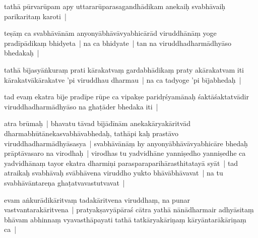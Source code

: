 \documentclass[article,12pt,a4paper]{memoir}%
\newcounter{parCount}
\begin{document}
	  \pstart \leavevmode%
	\label{thakur75-77.28a}tathā pūrvarūpam apy uttararūparasagandhādikam anekaiḥ svabhāvaiḥ parikaritaṃ karoti | 
	{}
	\pend%
      

	  \pstart \leavevmode%
	\label{thakur75-77.29}teṣāṃ ca svabhāvānām anyonyābhāvāvyabhicārād viruddhānāṃ yoge pradīpādikaṃ bhidyeta | na ca bhidyate | tan na viruddhadharmādhyāso bhedakaḥ | 
	{}
	\pend%
      

	  \pstart \leavevmode%
	\label{thakur75-78.1}tathā bījasyāṅkuraṃ prati kārakatvaṃ gardabhādikaṃ praty akārakatvam iti kārakatvākārakatve 'pi viruddhau dharmau | na ca tadyoge 'pi bījabhedaḥ | 
	{}
	\pend%
      

	  \pstart \leavevmode%
	\label{thakur75-78.3}tad evaṃ ekatra bīje pradīpe rūpe ca vipakṣe paridṛśyamānaḥ śaktāśaktatvādir viruddhadharmādhyāso na ghaṭāder bhedaka iti |
	{}
	\pend%
      

	  \pstart \leavevmode%
	\label{thakur75-78.5}atra brūmaḥ | bhavatu tāvad bījādīnām anekakāryakāritvād dharmabhūtānekasvabhāvabhedaḥ, tathāpi kaḥ prastāvo viruddhadharmādhyāsasya | svabhāvānāṃ hy anyonyābhāvāvyabhicāre bhedaḥ prāptāvasaro na virodhaḥ | virodhas tu yadvidhāne yanniṣedho yanniṣedhe ca yadvidhānaṃ tayor ekatra dharmiṇi parasparaparihārasthitatayā syāt | tad atraikaḥ svabhāvaḥ svābhāvena viruddho yukto bhāvābhāvavat | na tu svabhāvāntareṇa ghaṭatvavastutvavat | 
	{}
	\pend%
      

	  \pstart \leavevmode%
	\label{thakur75-78.10}evam aṅkurādikāritvaṃ tadakāritvena viruddhaṃ, na punar vastvantarakāritvena | pratyakṣavyāpāraś cātra yathā nānādharmair adhyāsitaṃ bhāvam abhinnaṃ vyavasthāpayati tathā tatkāryakāriṇaṃ kāryāntarākāriṇaṃ ca | 
	{}
	\pend%
      
\end{document}
